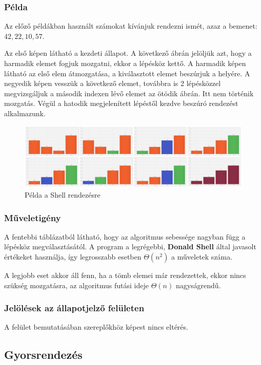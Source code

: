 \documentclass{elteikthesis}
\begin{document}
 \subsubsection{Példa}
 Az előző példákban használt számokat kívánjuk rendezni ismét, azaz a bemenet: $42, 22, 10, 57$.\par
 Az első képen látható a kezdeti állapot. A következő ábrán jelöljük azt, hogy a harmadik elemet fogjuk mozgatni, ekkor a lépésköz kettő. A harmadik képen látható az első elem átmozgatása, a kiválasztott elemet beszúrjuk a helyére. A negyedik képen vesszük a következő elemet, továbbra is 2 lépésközzel megvizsgáljuk a második indexen lévő elemet az ötödik ábrán. Itt nem történik mozgatás. Végül a hatodik megjelenített lépéstől kezdve beszúró rendezést alkalmazunk.\par
 \begin{figure}[H]
 	\centering
 	\includegraphics[width=1\textwidth]{pics/shell.jpg}
 	\caption{Példa a Shell rendezésre}
 \end{figure}\par
\subsubsection{Műveletigény}
 A fentebbi táblázatból látható, hogy az algoritmus sebessége nagyban függ a lépésköz megválasztásától. A program a legrégebbi, \textbf{Donald Shell} által javasolt értékeket\cite{Shell} használja, így legrosszabb esetben $\Theta(n^2)$ a műveletek száma.\par
 A legjobb eset akkor áll fenn, ha a tömb elemei már rendezettek, ekkor nincs szükség mozgatásra, az algoritmus futási ideje $\Theta(n)$ nagyságrendű.
\subsubsection{Jelölések az állapotjelző felületen}
 A felület bemutatásában szereplőkhöz képest nincs eltérés.

\subsection{Gyorsrendezés}
\end{document}

